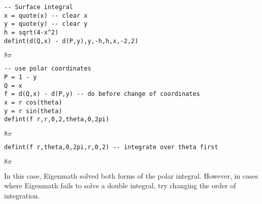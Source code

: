 {\color{blue}
\begin{verbatim}
-- Surface integral
x = quote(x) -- clear x
y = quote(y) -- clear y
h = sqrt(4-x^2)
defint(d(Q,x) - d(P,y),y,-h,h,x,-2,2)
\end{verbatim}
}

\noindent
$\displaystyle 8\pi$

{\color{blue}
\begin{verbatim}
-- use polar coordinates
P = 1 - y
Q = x
f = d(Q,x) - d(P,y) -- do before change of coordinates
x = r cos(theta)
y = r sin(theta)
defint(f r,r,0,2,theta,0,2pi)
\end{verbatim}
}

\noindent
$\displaystyle 8\pi$

{\color{blue}
\begin{verbatim}
defint(f r,theta,0,2pi,r,0,2) -- integrate over theta first
\end{verbatim}
}

\noindent
$\displaystyle 8\pi$

\bigskip
\noindent
In this case, Eigenmath solved both forms of the polar integral.
However, in cases where Eigenmath fails to solve a double integral, try
changing the order of integration.
